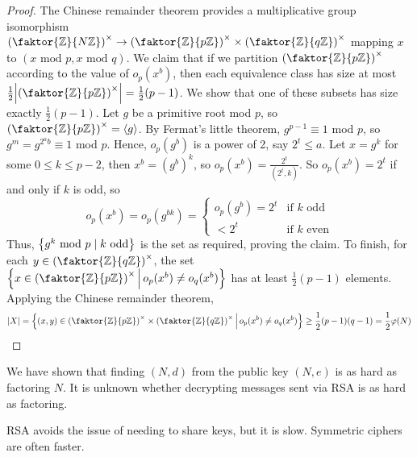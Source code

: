 \begin{proof}
    The Chinese remainder theorem provides a multiplicative group isomorphism \( \qty(\faktor{\mathbb Z}{N\mathbb Z})^\times \to \qty(\faktor{\mathbb Z}{p\mathbb Z})^\times \times \qty(\faktor{\mathbb Z}{q\mathbb Z})^\times \) mapping \( x \) to \( (x \text{ mod } p, x \text{ mod } q) \).
    We claim that if we partition \( \qty(\faktor{\mathbb Z}{p\mathbb Z})^\times \) according to the value of \( o_p(x^b) \), then each equivalence class has size at most \( \frac{1}{2} \abs{\qty(\faktor{\mathbb Z}{p\mathbb Z})^\times} = \frac{1}{2}(p-1) \).
    We show that one of these subsets has size exactly \( \frac{1}{2}(p-1) \).
    Let \( g \) be a primitive root mod \( p \), so \( \qty(\faktor{\mathbb Z}{p\mathbb Z})^\times = \genset{g} \).
    By Fermat's little theorem, \( g^{p-1} \equiv 1 \) mod \( p \), so \( g^m = g^{2^a b} \equiv 1 \) mod \( p \).
    Hence, \( o_p(g^b) \) is a power of 2, say \( 2^t \leq a \).
    Let \( x = g^k \) for some \( 0 \leq k \leq p - 2 \), then \( x^b = (g^b)^k \), so \( o_p(x^b) = \frac{2^t}{(2^t, k)} \).
    So \( o_p(x^b) = 2^t \) if and only if \( k \) is odd, so
    \[ o_p(x^b) = o_p(g^{bk}) = \begin{cases}
        o_p(g^b) = 2^t & \text{if } k \text{ odd} \\
        < 2^t & \text{if } k \text{ even}
    \end{cases} \]
    Thus, \( \qty{g^k \text{ mod } p \mid k \text{ odd}} \) is the set as required, proving the claim.
    To finish, for each \( y \in \qty(\faktor{\mathbb Z}{q\mathbb Z})^\times \), the set \( \qty{x \in \qty(\faktor{\mathbb Z}{p\mathbb Z})^\times \midd o_p(x^b) \neq o_q(x^b)} \) has at least \( \frac{1}{2}(p-1) \) elements.
    Applying the Chinese remainder theorem,
    \[ \abs{X} = \qty{(x,y) \in \qty(\faktor{\mathbb Z}{p\mathbb Z})^\times \times \qty(\faktor{\mathbb Z}{q\mathbb Z})^\times \midd o_p(x^b) \neq o_q(x^b)} \geq \frac{1}{2}(p-1)(q-1) = \frac{1}{2}\varphi(N) \]
\end{proof}
\begin{remark}
    We have shown that finding \( (N, d) \) from the public key \( (N, e) \) is as hard as factoring \( N \).
    It is unknown whether decrypting messages sent via RSA is as hard as factoring.

    RSA avoids the issue of needing to share keys, but it is slow.
    Symmetric ciphers are often faster.
\end{remark}
